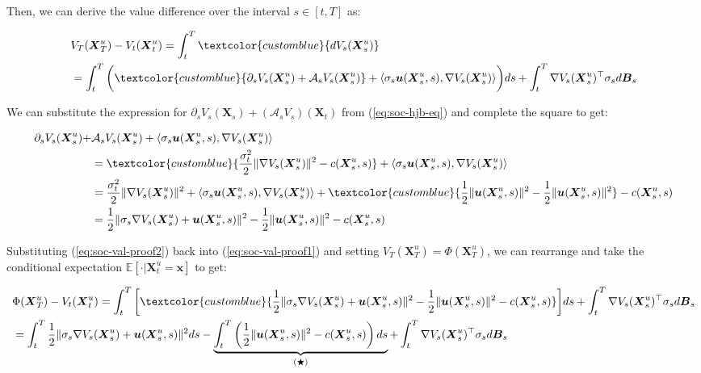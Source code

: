 \documentclass{article}
\newcommand{\bluetext}[1]{\textcolor{customblue}{#1}}
\begin{document}
Then, we can derive the value difference over the interval $s\in [t,T]$ as:
\begin{small}
\begin{align}
    &V_T(\boldsymbol{X}^u_T)-V_t(\boldsymbol{X}^u_t)=\int_t^T\bluetext{dV_s(\boldsymbol{X}^u_s)}\nonumber\\
    &=\int_t^T\bigg(\bluetext{\partial_sV_s(\boldsymbol{X}^u_s)+\mathcal{A}_sV_s(\boldsymbol{X}^u_s)}+\langle\sigma_s\boldsymbol{u}(\boldsymbol{X}^u_s,s), \nabla V_s(\boldsymbol{X}^u_s)\rangle\bigg)ds +\int _t^T \nabla V_s(\boldsymbol{X}^u_s)^\top \sigma_s d\boldsymbol{B}_s\label{eq:soc-val-proof1}
\end{align}
\end{small}
We can substitute the expression for $\partial_sV_s(\boldsymbol{X}_s)+(\mathcal{A}_sV_s)(\boldsymbol{X}_t)$ from (\ref{eq:soc-hjb-eq}) and complete the square to get:
\begin{small}
\begin{align}
    \partial_sV_s(\boldsymbol{X}^u_s)+&\mathcal{A}_sV_s(\boldsymbol{X}^u_s)+\langle\sigma_s\boldsymbol{u}(\boldsymbol{X}^u_s,s), \nabla V_s(\boldsymbol{X}^u_s)\rangle\nonumber\\
    &=\bluetext{\frac{\sigma_t^2}{2}\|\nabla V_s(\boldsymbol{X}^u_s)\|^2-c(\boldsymbol{X}^u_s,s)}+\langle\sigma_s\boldsymbol{u}(\boldsymbol{X}^u_s,s), \nabla V_s(\boldsymbol{X}^u_s)\rangle\nonumber\\
    &=\frac{\sigma_t^2}{2}\|\nabla V_s(\boldsymbol{X}^u_s)\|^2+\langle\sigma_s\boldsymbol{u}(\boldsymbol{X}^u_s,s), \nabla V_s(\boldsymbol{X}^u_s)\rangle+\bluetext{\frac{1}{2}\|\boldsymbol{u}(\boldsymbol{X}^u_s,s)\|^2-\frac{1}{2}\|\boldsymbol{u}(\boldsymbol{X}^u_s,s)\|^2}-c(\boldsymbol{X}^u_s,s)\nonumber\\
    &=\frac{1}{2}\|\sigma_s\nabla V_s(\boldsymbol{X}^u_s)+\boldsymbol{u}(\boldsymbol{X}^u_s,s)\|^2-\frac{1}{2}\|\boldsymbol{u}(\boldsymbol{X}^u_s,s)\|^2-c(\boldsymbol{X}^u_s,s)\label{eq:soc-val-proof2}
\end{align}
\end{small}
Substituting (\ref{eq:soc-val-proof2}) back into (\ref{eq:soc-val-proof1}) and setting $V_T(\boldsymbol{X}^u_T)=\Phi(\boldsymbol{X}^u_T)$, we can rearrange and take the conditional expectation $\mathbb{E}[\cdot|\boldsymbol{X}^u_t=\boldsymbol{x}]$ to get:
\begin{small}
\begin{align}
    &\Phi(\boldsymbol{X}^u_T)-V_t(\boldsymbol{X}^u_t)=\int_t^T\bigg[\bluetext{\frac{1}{2}\|\sigma_s\nabla V_s(\boldsymbol{X}^u_s)+\boldsymbol{u}(\boldsymbol{X}^u_s,s)\|^2-\frac{1}{2}\|\boldsymbol{u}(\boldsymbol{X}^u_s,s)\|^2-c(\boldsymbol{X}^u_s,s)}\bigg]ds +\int _t^T \nabla V_s(\boldsymbol{X}^u_s)^\top \sigma_s d\boldsymbol{B}_s\nonumber\\
    & =\int_t^T\frac{1}{2}\|\sigma_s\nabla V_s(\boldsymbol{X}^u_s)+\boldsymbol{u}(\boldsymbol{X}^u_s,s)\|^2ds-\underbrace{\int_t^T\left(\frac{1}{2}\|\boldsymbol{u}(\boldsymbol{X}^u_s,s)\|^2-c(\boldsymbol{X}^u_s,s)\right)ds}_{(\bigstar)} +\int _t^T \nabla V_s(\boldsymbol{X}^u_s)^\top \sigma_s d\boldsymbol{B}_s
\end{align}
\end{small}
\end{document}
